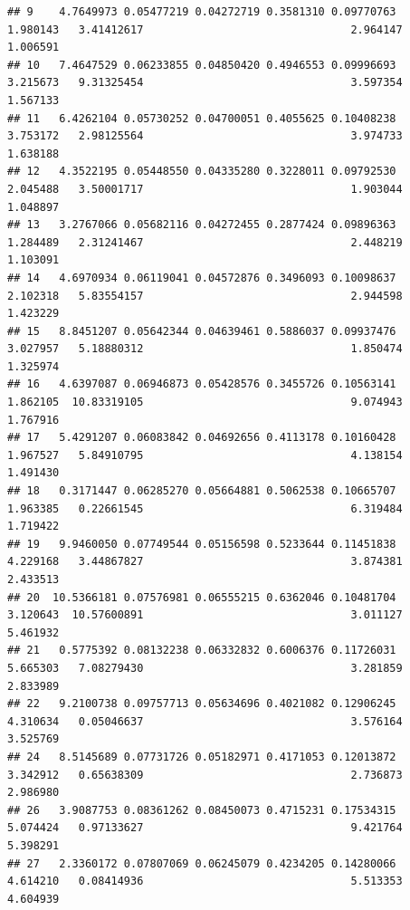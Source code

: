 \documentclass[
]{article}
\begin{document}
\begin{verbatim}
## 9    4.7649973 0.05477219 0.04272719 0.3581310 0.09770763                       1.980143   3.41412617                                2.964147       1.006591
## 10   7.4647529 0.06233855 0.04850420 0.4946553 0.09996693                       3.215673   9.31325454                                3.597354       1.567133
## 11   6.4262104 0.05730252 0.04700051 0.4055625 0.10408238                       3.753172   2.98125564                                3.974733       1.638188
## 12   4.3522195 0.05448550 0.04335280 0.3228011 0.09792530                       2.045488   3.50001717                                1.903044       1.048897
## 13   3.2767066 0.05682116 0.04272455 0.2877424 0.09896363                       1.284489   2.31241467                                2.448219       1.103091
## 14   4.6970934 0.06119041 0.04572876 0.3496093 0.10098637                       2.102318   5.83554157                                2.944598       1.423229
## 15   8.8451207 0.05642344 0.04639461 0.5886037 0.09937476                       3.027957   5.18880312                                1.850474       1.325974
## 16   4.6397087 0.06946873 0.05428576 0.3455726 0.10563141                       1.862105  10.83319105                                9.074943       1.767916
## 17   5.4291207 0.06083842 0.04692656 0.4113178 0.10160428                       1.967527   5.84910795                                4.138154       1.491430
## 18   0.3171447 0.06285270 0.05664881 0.5062538 0.10665707                       1.963385   0.22661545                                6.319484       1.719422
## 19   9.9460050 0.07749544 0.05156598 0.5233644 0.11451838                       4.229168   3.44867827                                3.874381       2.433513
## 20  10.5366181 0.07576981 0.06555215 0.6362046 0.10481704                       3.120643  10.57600891                                3.011127       5.461932
## 21   0.5775392 0.08132238 0.06332832 0.6006376 0.11726031                       5.665303   7.08279430                                3.281859       2.833989
## 22   9.2100738 0.09757713 0.05634696 0.4021082 0.12906245                       4.310634   0.05046637                                3.576164       3.525769
## 24   8.5145689 0.07731726 0.05182971 0.4171053 0.12013872                       3.342912   0.65638309                                2.736873       2.986980
## 26   3.9087753 0.08361262 0.08450073 0.4715231 0.17534315                       5.074424   0.97133627                                9.421764       5.398291
## 27   2.3360172 0.07807069 0.06245079 0.4234205 0.14280066                       4.614210   0.08414936                                5.513353       4.604939

\end{verbatim}
\end{document}
